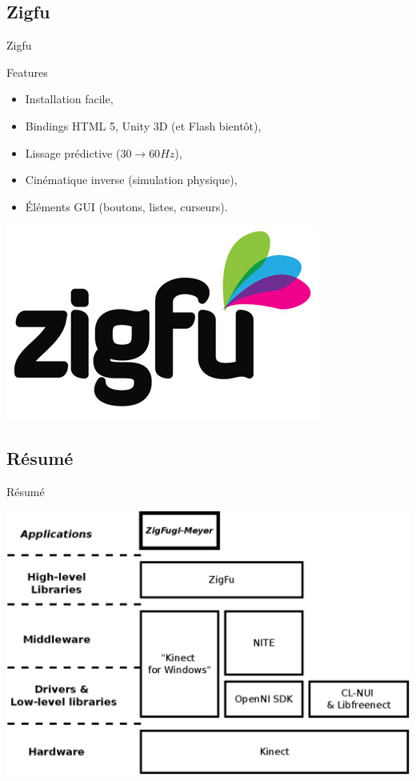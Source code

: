 \subsection{Zigfu}
\begin{frame}{Zigfu}
\begin{block}{Features~\cite{zigfu_video}}
  \begin{itemize}
  \item Installation facile, 
  \item Bindings HTML 5, Unity 3D (et Flash bientôt),
  \item Lissage prédictive ($30 \rightarrow 60Hz$), 
  \item Cinématique inverse (simulation physique),
  \item Éléments GUI (boutons, listes, curseurs).
  \end{itemize}
\end{block}
\begin{center}
\includegraphics[width=0.2\linewidth]{../images/zigfu_logo}
\end{center}
\end{frame}

\subsection{Résumé}
\begin{frame}{Résumé}
\begin{center}
\includegraphics[width=0.9\linewidth]{../images/technology_overview_4}
\end{center}
\end{frame}